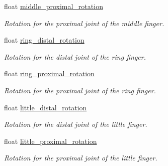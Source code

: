 \begin{DoxyCompactItemize}
float \hyperlink{struct_rotation_context_ad66ce02bfed77b041d5848f74589760c}{middle\+\_\+proximal\+\_\+rotation}
\begin{DoxyCompactList}\small\item\em Rotation for the proximal joint of the middle finger. \end{DoxyCompactList}\item 
\mbox{\label{struct_rotation_context_afb07f445f1b040eeb47d7acb3b6c2166}} 
float \hyperlink{struct_rotation_context_afb07f445f1b040eeb47d7acb3b6c2166}{ring\+\_\+distal\+\_\+rotation}
\begin{DoxyCompactList}\small\item\em Rotation for the distal joint of the ring finger. \end{DoxyCompactList}\item 
\mbox{\label{struct_rotation_context_a620e9eb808b01379fe03aca093b5033b}} 
float \hyperlink{struct_rotation_context_a620e9eb808b01379fe03aca093b5033b}{ring\+\_\+proximal\+\_\+rotation}
\begin{DoxyCompactList}\small\item\em Rotation for the proximal joint of the ring finger. \end{DoxyCompactList}\item 
\mbox{\label{struct_rotation_context_a7d156c70a2adcad6d3917dfa732daaf7}} 
float \hyperlink{struct_rotation_context_a7d156c70a2adcad6d3917dfa732daaf7}{little\+\_\+distal\+\_\+rotation}
\begin{DoxyCompactList}\small\item\em Rotation for the distal joint of the little finger. \end{DoxyCompactList}\item 
\mbox{\label{struct_rotation_context_a869372b9af3b26e0239a12d4e6329ed3}} 
float \hyperlink{struct_rotation_context_a869372b9af3b26e0239a12d4e6329ed3}{little\+\_\+proximal\+\_\+rotation}
\begin{DoxyCompactList}\small\item\em Rotation for the proximal joint of the little finger. \end{DoxyCompactList}\item 
\mbox{\label{struct_rotation_context_a1c439291c0fbae6cda389e2baa11e60f}} 

\end{DoxyCompactItemize}
